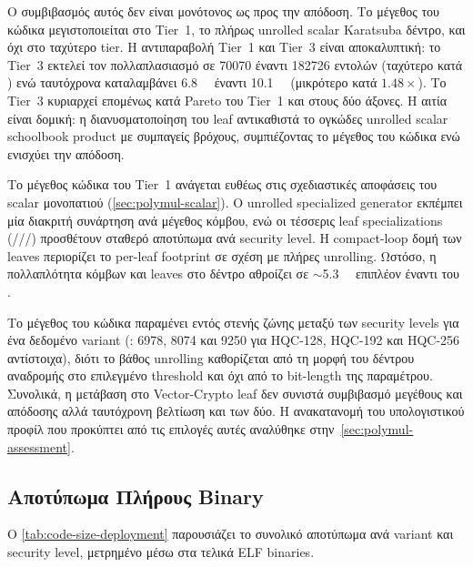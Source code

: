 Ο συμβιβασμός αυτός δεν είναι μονότονος ως προς την απόδοση. Το μέγεθος του κώδικα
μεγιστοποιείται στο Tier~1, το πλήρως unrolled scalar Karatsuba δέντρο,
και όχι στο ταχύτερο tier. Η αντιπαραβολή Tier~1 και Tier~3 είναι
αποκαλυπτική: το Tier~3 εκτελεί τον πολλαπλασιασμό σε \num{70070} έναντι
\num{182726} εντολών (ταχύτερο κατά ) ενώ ταυτόχρονα καταλαμβάνει
\SI{6.8}{\kilo\byte} έναντι \SI{10.1}{\kilo\byte} (μικρότερο κατά $1.48\times$).
Το Tier~3 κυριαρχεί επομένως κατά Pareto του Tier~1 και στους δύο άξονες. Η
αιτία είναι δομική: η διανυσματοποίηση του leaf αντικαθιστά το ογκώδες
unrolled scalar schoolbook product με συμπαγείς \vclmul{} βρόχους,
συμπιέζοντας το μέγεθος του κώδικα ενώ ενισχύει την απόδοση.

Το μέγεθος κώδικα του Tier~1 ανάγεται ευθέως στις σχεδιαστικές αποφάσεις του scalar
μονοπατιού (\cref{sec:polymul-scalar}). Ο unrolled specialized generator εκπέμπει
μία διακριτή συνάρτηση ανά μέγεθος κόμβου, ενώ οι τέσσερις leaf specializations
(///) προσθέτουν σταθερό
αποτύπωμα ανά security level. Η compact-loop δομή των leaves περιορίζει
το per-leaf footprint σε σχέση με πλήρες unrolling. Ωστόσο, η πολλαπλότητα
κόμβων και leaves στο δέντρο αθροίζει σε $\sim$\SI{5.3}{\kilo\byte} επιπλέον
έναντι του .

Το μέγεθος του κώδικα παραμένει εντός στενής ζώνης μεταξύ των security levels για ένα
δεδομένο variant (: \SI{6978}{\byte}, \SI{8074}{\byte} και
\SI{9250}{\byte} για HQC-128, HQC-192 και HQC-256 αντίστοιχα), διότι το βάθος
unrolling καθορίζεται από τη μορφή του δέντρου αναδρομής στο επιλεγμένο
threshold και όχι από το bit-length της παραμέτρου. Συνολικά, η μετάβαση στο
Vector-Crypto leaf δεν συνιστά συμβιβασμό μεγέθους και απόδοσης αλλά ταυτόχρονη
βελτίωση και των δύο. Η ανακατανομή του υπολογιστικού προφίλ που προκύπτει από
τις επιλογές αυτές αναλύθηκε στην~\cref{sec:polymul-assessment}.

\subsection{Αποτύπωμα Πλήρους \KEM Binary}
\label{ssec:full-kem-footprint}

Ο \cref{tab:code-size-deployment} παρουσιάζει το συνολικό 
αποτύπωμα ανά variant και security level, μετρημένο μέσω
 στα τελικά ELF binaries.

